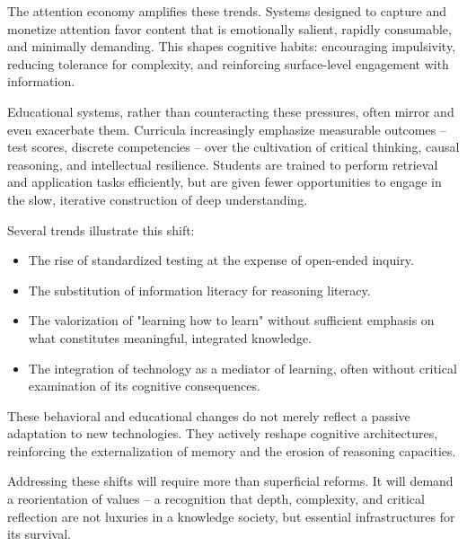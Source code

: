The attention economy amplifies these trends. Systems designed to
capture and monetize attention favor content that is emotionally
salient, rapidly consumable, and minimally demanding. This shapes
cognitive habits: encouraging impulsivity, reducing tolerance for
complexity, and reinforcing surface-level engagement with information.

Educational systems, rather than counteracting these pressures, often
mirror and even exacerbate them. Curricula increasingly emphasize
measurable outcomes -- test scores, discrete competencies -- over the
cultivation of critical thinking, causal reasoning, and intellectual
resilience. Students are trained to perform retrieval and application
tasks efficiently, but are given fewer opportunities to engage in the
slow, iterative construction of deep understanding.

Several trends illustrate this shift:

\begin{itemize}
	\item The rise of standardized testing at the expense of open-ended inquiry.
	\item The substitution of information literacy for reasoning literacy.
	\item The valorization of "learning how to learn" without sufficient 
	emphasis on what constitutes meaningful, integrated knowledge.
	\item The integration of technology as a mediator of learning, often 
	without critical examination of its cognitive consequences.
\end{itemize}

These behavioral and educational changes do not merely reflect a passive
adaptation to new technologies. They actively reshape cognitive
architectures, reinforcing the externalization of memory and the erosion
of reasoning capacities.

Addressing these shifts will require more than superficial reforms. It
will demand a reorientation of values -- a recognition that depth,
complexity, and critical reflection are not luxuries in a knowledge
society, but essential infrastructures for its survival.

